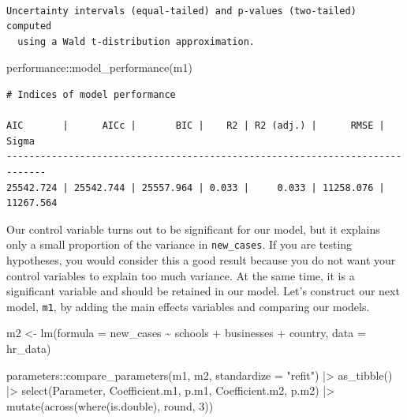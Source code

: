 \documentclass[
  letterpaper,
]{krantz}
\makeatletter
\newenvironment{Shaded}{\begin{snugshade}}{\end{snugshade}}
\newcommand{\AttributeTok}[1]{\textcolor[rgb]{0.40,0.45,0.13}{#1}}
\newcommand{\DecValTok}[1]{\textcolor[rgb]{0.68,0.00,0.00}{#1}}
\newcommand{\FunctionTok}[1]{\textcolor[rgb]{0.28,0.35,0.67}{#1}}
\newcommand{\NormalTok}[1]{\textcolor[rgb]{0.00,0.23,0.31}{#1}}
\newcommand{\OtherTok}[1]{\textcolor[rgb]{0.00,0.23,0.31}{#1}}
\newcommand{\SpecialCharTok}[1]{\textcolor[rgb]{0.37,0.37,0.37}{#1}}
\newcommand{\StringTok}[1]{\textcolor[rgb]{0.13,0.47,0.30}{#1}}
\newenvironment{kframe}{%
\medskip{}
\setlength{\fboxsep}{.8em}
 \def\at@end@of@kframe{}%
 \ifinner\ifhmode%
  \def\at@end@of@kframe{\end{minipage}}%
  \begin{minipage}{\columnwidth}%
 \fi\fi%
 \def\FrameCommand##1{\hskip\@totalleftmargin \hskip-\fboxsep
 \colorbox{shadecolor}{##1}\hskip-\fboxsep
     \hskip-\linewidth \hskip-\@totalleftmargin \hskip\columnwidth}%
 \MakeFramed {\advance\hsize-\width
   \@totalleftmargin\z@ \linewidth\hsize
   \@setminipage}}%
 {\par\unskip\endMakeFramed%
 \at@end@of@kframe}
\renewenvironment{Shaded}{\begin{kframe}}{\end{kframe}}
\makeatother
\begin{document}
\begin{verbatim}

Uncertainty intervals (equal-tailed) and p-values (two-tailed) computed
  using a Wald t-distribution approximation.
\end{verbatim}

\begin{Shaded}
\begin{Highlighting}[]
\NormalTok{performance}\SpecialCharTok{::}\FunctionTok{model\_performance}\NormalTok{(m1)}
\end{Highlighting}
\end{Shaded}

\begin{verbatim}
# Indices of model performance

AIC       |      AICc |       BIC |    R2 | R2 (adj.) |      RMSE |     Sigma
-----------------------------------------------------------------------------
25542.724 | 25542.744 | 25557.964 | 0.033 |     0.033 | 11258.076 | 11267.564
\end{verbatim}

Our control variable turns out to be significant for our model, but it
explains only a small proportion of the variance in \texttt{new\_cases}.
If you are testing hypotheses, you would consider this a good result
because you do not want your control variables to explain too much
variance. At the same time, it is a significant variable and should be
retained in our model. Let's construct our next model, \texttt{m1}, by
adding the main effects variables and comparing our models.

\begin{Shaded}
\begin{Highlighting}[]
\NormalTok{m2 }\OtherTok{\textless{}{-}} \FunctionTok{lm}\NormalTok{(}\AttributeTok{formula =}\NormalTok{ new\_cases }\SpecialCharTok{\textasciitilde{}}
\NormalTok{           schools }\SpecialCharTok{+}
\NormalTok{           businesses }\SpecialCharTok{+}
\NormalTok{           country,}
         \AttributeTok{data =}\NormalTok{ hr\_data)}

\NormalTok{parameters}\SpecialCharTok{::}\FunctionTok{compare\_parameters}\NormalTok{(m1, m2, }\AttributeTok{standardize =} \StringTok{"refit"}\NormalTok{) }\SpecialCharTok{|\textgreater{}}
  \FunctionTok{as\_tibble}\NormalTok{() }\SpecialCharTok{|\textgreater{}}
  \FunctionTok{select}\NormalTok{(Parameter, Coefficient.m1, p.m1, Coefficient.m2, p.m2) }\SpecialCharTok{|\textgreater{}}
  \FunctionTok{mutate}\NormalTok{(}\FunctionTok{across}\NormalTok{(}\FunctionTok{where}\NormalTok{(is.double), round, }\DecValTok{3}\NormalTok{))}
\end{Highlighting}
\end{Shaded}
\end{document}
